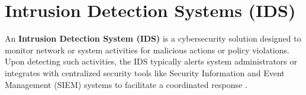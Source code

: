 \documentclass{report}
\begin{document}
\section{Intrusion Detection Systems (IDS)}

An \textbf{Intrusion Detection System (IDS)} is a cybersecurity solution designed to monitor network or system activities for malicious actions or policy violations. Upon detecting such activities, the IDS typically alerts system administrators or integrates with centralized security tools like Security Information and Event Management (SIEM) systems to facilitate a coordinated response \cite{ibm_ids}.








\end{document}
